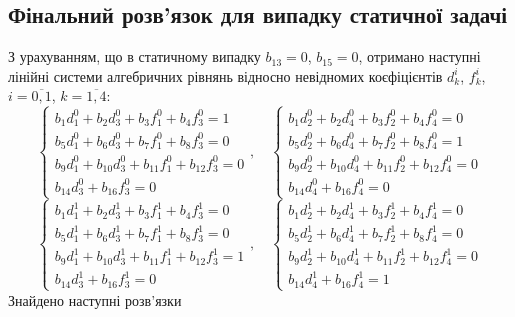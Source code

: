 \subsection*{Фінальний розв'язок для випадку статичної задачі}
З урахуванням, що в статичному випадку $b_{13} = 0$, $b_{15} = 0$,
отримано наступні лінійні системи алгебричних рівнянь відносно невідномих коєфіцієнтів $d_k^i$, $f_k^i$, $i=\overline{0,1}$, $k=\overline{1,4}$:
\begin{equation*}
    \begin{cases}
        b_1 d_1^0 + b_2 d_3^0 + b_3 f_1^0 + b_4 f_3^0 = 1 \\
        b_5 d_1^0 + b_6 d_3^0 + b_7 f_1^0 + b_8 f_3^0 = 0 \\
        b_9 d_1^0 + b_{10} d_3^0 + b_{11} f_1^0 + b_{12} f_3^0 = 0 \\
        b_{14} d_3^0 + b_{16} f_3^0 = 0
    \end{cases}, \quad
    \begin{cases}
        b_1 d_2^0 + b_2 d_4^0 + b_3 f_2^0 + b_4 f_4^0 = 0 \\
        b_5 d_2^0 + b_6 d_4^0 + b_7 f_2^0 + b_8 f_4^0 = 1 \\
        b_9 d_2^0 + b_{10} d_4^0 + b_{11} f_2^0 + b_{12} f_4^0 = 0 \\
        b_{14} d_4^0 + b_{16} f_4^0 = 0
    \end{cases}
\end{equation*}
\begin{equation*}
    \begin{cases}
        b_1 d_1^1 + b_2 d_3^1 + b_3 f_1^1 + b_4 f_3^1 = 0 \\
        b_5 d_1^1 + b_6 d_3^1 + b_7 f_1^1 + b_8 f_3^1 = 0 \\
        b_9 d_1^1 + b_{10} d_3^1 + b_{11} f_1^1 + b_{12} f_3^1 = 1 \\
       b_{14} d_3^1 + b_{16} f_3^1 = 0
    \end{cases}, \quad
    \begin{cases}
        b_1 d_2^1 + b_2 d_4^1 + b_3 f_2^1 + b_4 f_4^1 = 0 \\
        b_5 d_2^1 + b_6 d_4^1 + b_7 f_2^1 + b_8 f_4^1 = 0 \\
        b_9 d_2^1 + b_{10} d_4^1 + b_{11} f_2^1 + b_{12} f_4^1 = 0 \\
        b_{14} d_4^1 + b_{16} f_4^1 = 1
    \end{cases}
\end{equation*}
Знайдено наступні розв'язки
